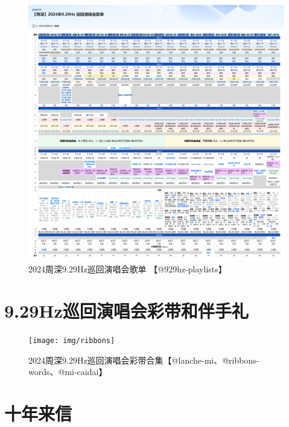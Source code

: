 \documentclass[]{ctexbook}
\begin{document}
\begin{figure}

{\centering \includegraphics{img/playlists/playlists} 

}

\caption{2024周深9.29Hz巡回演唱会歌单 【@929hz-playlists】}\label{fig:unnamed-chunk-182}
\end{figure}

\chapter{9.29Hz巡回演唱会彩带和伴手礼}\label{appendix-gift}

\begin{figure}

{\centering \texttt{[image: img/ribbons]} 

}

\caption{2024周深9.29Hz巡回演唱会彩带合集【@lanche-mi、@ribbons-words、@mi-caidai】}\label{fig:unnamed-chunk-184}
\end{figure}

\chapter{十年来信}\label{appendix-letter}
\end{document}
